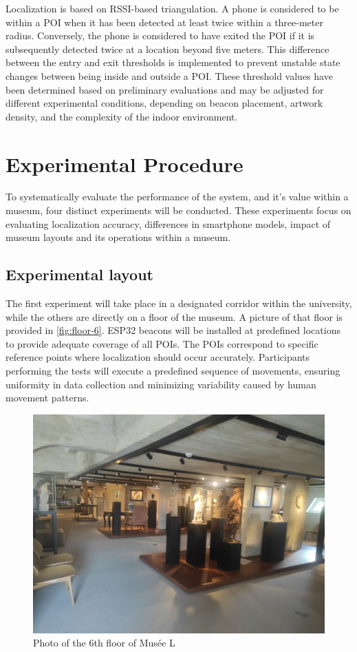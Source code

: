 Localization is based on RSSI-based triangulation. A phone is considered to be within a POI when it has been detected at least twice within a three-meter radius. Conversely, the phone is considered to have exited the POI if it is subsequently detected twice at a location beyond five meters. This difference between the entry and exit thresholds is implemented to prevent unstable state changes between being inside and outside a POI. These threshold values have been determined based on preliminary evaluations and may be adjusted for different experimental conditions, depending on beacon placement, artwork density, and the complexity of the indoor environment.

\section{Experimental Procedure}

To systematically evaluate the performance of the system, and it's value within a museum, four distinct experiments will be conducted. These experiments focus on evaluating localization accuracy, differences in smartphone models, impact of museum layouts and its operations within a museum.

\subsection{Experimental layout}

The first experiment will take place in a designated corridor within the university, while the others are directly on a floor of the museum. A picture of that floor is provided in \autoref{fig:floor-6}. ESP32 beacons will  be installed at predefined locations to provide adequate coverage of all POIs. The POIs correspond to specific reference points where localization should occur accurately. Participants performing the tests will execute a predefined sequence of movements, ensuring uniformity in data collection and minimizing variability caused by human movement patterns.

\begin{figure}
    \centering
    \includegraphics[width=0.75\linewidth]{assets/image-floor.jpg}
    \caption{Photo of the 6th floor of Musée L}
    \label{fig:floor-6}
\end{figure}

